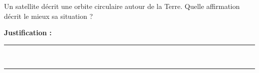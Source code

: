 Un satellite décrit une orbite circulaire autour de la Terre. Quelle affirmation décrit le mieux sa situation ?

\choices

\noindent\textbf{Justification :} \hrulefill \\[2.5ex]
\rule{\linewidth}{0.4pt} \\[2.5ex]
\rule{\linewidth}{0.4pt}
\vfill
